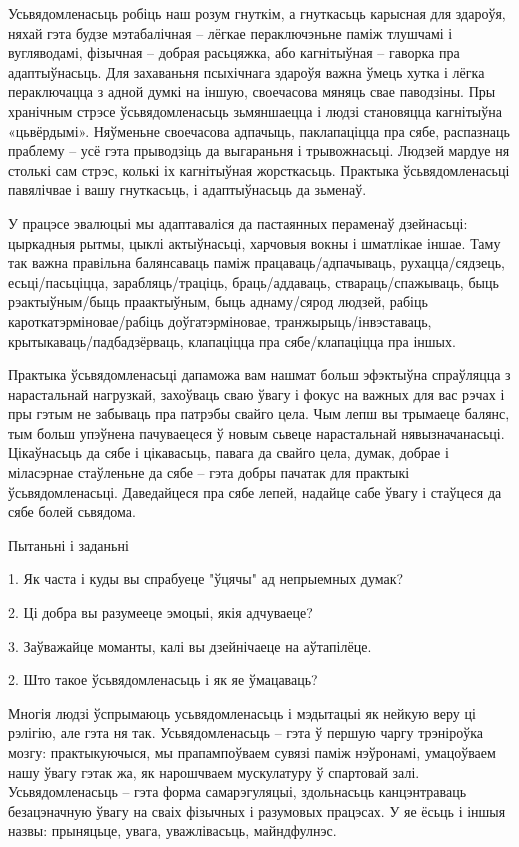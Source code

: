 Усьвядомленасьць робіць наш розум гнуткім, а гнуткасьць карысная для здароўя, няхай гэта будзе мэтабалічная – лёгкае пераключэньне паміж тлушчамі і вугляводамі, фізычная – добрая расьцяжка, або кагнітыўная – гаворка пра адаптыўнасьць. Для захаваньня псыхічнага здароўя важна ўмець хутка і лёгка пераключацца з адной думкі на іншую, своечасова мяняць свае паводзіны. Пры хранічным стрэсе ўсьвядомленасьць зьмяншаецца і людзі становяцца кагнітыўна «цьвёрдымі». Няўменьне своечасова адпачыць, паклапаціцца пра сябе, распазнаць праблему – усё гэта прыводзіць да выгараньня і трывожнасьці. Людзей мардуе ня столькі сам стрэс, колькі іх кагнітыўная жорсткасьць. Практыка ўсьвядомленасьці павялічвае і вашу гнуткасьць, і адаптыўнасьць да зьменаў.

У працэсе эвалюцыі мы адаптаваліся да пастаянных пераменаў дзейнасьці: цыркадныя рытмы, цыклі актыўнасьці, харчовыя вокны і шматлікае іншае. Таму так важна правільна балянсаваць паміж працаваць/адпачываць, рухацца/сядзець, есьці/пасьціцца, зарабляць/траціць, браць/аддаваць, ствараць/спажываць, быць рэактыўным/быць праактыўным, быць аднаму/сярод людзей, рабіць кароткатэрміновае/рабіць доўгатэрміновае, транжырыць/інвэставаць, крытыкаваць/падбадзёрваць, клапаціцца пра сябе/клапаціцца пра іншых.

Практыка ўсьвядомленасьці дапаможа вам нашмат больш эфэктыўна спраўляцца з нарастальнай нагрузкай, захоўваць сваю ўвагу і фокус на важных для вас рэчах і пры гэтым не забываць пра патрэбы свайго цела. Чым лепш вы трымаеце балянс, тым больш упэўнена пачуваецеся ў новым сьвеце нарастальнай нявызначанасьці. Цікаўнасьць да сябе і цікавасьць, павага да свайго цела, думак, добрае і міласэрнае стаўленьне да сябе – гэта добры пачатак для практыкі ўсьвядомленасьці. Даведайцеся пра сябе лепей, надайце сабе ўвагу і стаўцеся да сябе болей сьвядома.

Пытаньні і заданьні

1. Як часта і куды вы спрабуеце "ўцячы" ад непрыемных думак?

2. Ці добра вы разумееце эмоцыі, якія адчуваеце?

3. Заўважайце моманты, калі вы дзейнічаеце на аўтапілёце.


2. Што такое ўсьвядомленасьць і як яе ўмацаваць?

Многія людзі ўспрымаюць усьвядомленасьць і мэдытацыі як нейкую веру ці рэлігію, але гэта ня так. Усьвядомленасьць – гэта ў першую чаргу трэніроўка мозгу: практыкуючыся, мы прапампоўваем сувязі паміж нэўронамі, умацоўваем нашу ўвагу гэтак жа, як нарошчваем мускулатуру ў спартовай залі. Усьвядомленасьць – гэта форма самарэгуляцыі, здольнасьць канцэнтраваць безацэначную ўвагу на сваіх фізычных і разумовых працэсах. У яе ёсьць і іншыя назвы: прыняцьце, увага, уважлівасьць, майндфулнэс.

